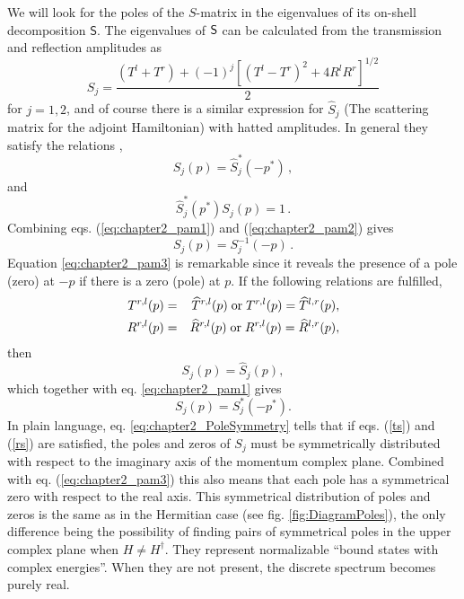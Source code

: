We will look for the poles of the $S$-matrix in the eigenvalues of its on-shell decomposition $\mathsf{S}$. The eigenvalues of $\sf{S}$ can be calculated from the transmission and reflection amplitudes as
%
\begin{equation}
	S_j=\frac{(T^l+T^r)+(-1)^j[(T^l-T^r)^2+4R^lR^r]^{1/2}}{2}
	\label{eq:chapter2_SEigenvalues}
\end{equation}
%
for $j=1,2$, and of course there is a similar expression for $\widehat{S}_j$ (The scattering matrix for the adjoint Hamiltonian) with hatted amplitudes.
In general they satisfy the relations \cite{Muga2004},
%
\begin{equation}\label{eq:chapter2_pam1}
	S_j(p)=\widehat{S}_j^*(-p^*)\,,
\end{equation}
%
and
%
\begin{equation}\label{eq:chapter2_pam2}
	\widehat{S}_j^*(p^*)S_j(p)=1\,.
\end{equation}
%
Combining eqs. (\ref{eq:chapter2_pam1}) and (\ref{eq:chapter2_pam2}) gives
%
\begin{equation}\label{eq:chapter2_pam3}
	S_j(p)=S^{-1}_j(-p)\,.
\end{equation}
%
Equation \eqref{eq:chapter2_pam3} is remarkable since it reveals the presence of a pole (zero) at $-p$ if there is a zero (pole) at $p$.
%
If the following relations are fulfilled,
%
\begin{eqnarray}
	T^{r,l}(p)&=&\widehat{T}^{r,l}(p)\; {\rm or}\; T^{r,l}(p)=\widehat{T}^{l,r}(p),
	\label{ts}
	\\
	R^{r,l}(p)&=&\widehat{R}^{r,l}(p)\; {\rm or}\; R^{r,l}(p)=\widehat{R}^{l,r}(p),
	\label{rs}
\end{eqnarray}
%
then
%
\begin{equation}
	S_j(p)=\widehat{S}_j(p),
\end{equation}
%
which together with eq. \eqref{eq:chapter2_pam1} gives
%
\begin{equation}
	S_j(p)=S_j^*(-p^*).
	\label{eq:chapter2_PoleSymmetry}
\end{equation}
In plain language, eq. \eqref{eq:chapter2_PoleSymmetry} tells that if eqs. (\ref{ts}) and (\ref{rs}) are satisfied,  the poles and zeros of $S_j$ must be symmetrically distributed with respect to the imaginary axis of the momentum complex plane. Combined with eq. (\ref{eq:chapter2_pam3})
this also means that each pole has a symmetrical zero with respect to the real axis. This symmetrical distribution of poles and zeros is the same as in the Hermitian case (see fig. \ref{fig:DiagramPoles}),
the only difference being the possibility
of finding pairs of symmetrical poles in the upper complex plane when $H\neq H^\dagger$. They represent normalizable ``bound states
with complex energies''. When they  are not present, the discrete spectrum becomes purely real.


